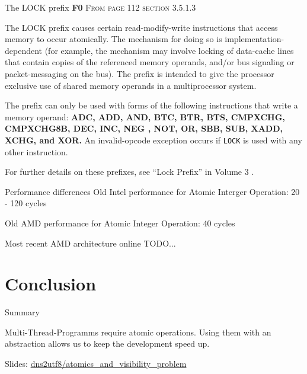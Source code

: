 \documentclass[10pt]{beamer}
\begin{document}
\begin{frame}{The LOCK prefix \textbf{F0}}
    \textsc{From page 112 section 3.5.1.3 \cite{AMD64ArchVol1}}

    The LOCK prefix causes certain
read-modify-write instructions that access memory to occur atomically.
The mechanism for doing so is \alert{implementation-dependent} (for example, the mechanism
may involve \alert{locking} of \alert{data-cache lines} that contain copies of
the referenced memory operands, and/or \alert{bus signaling} or packet-messaging on the bus).
The prefix is intended to give the processor exclusive use of shared memory
operands in a multiprocessor system.

The prefix can only be used with forms of the following instructions that write a memory operand:
\textbf{ADC, ADD, AND, BTC, BTR, BTS, CMPXCHG, CMPXCHG8B, DEC, INC, NEG
, NOT, OR, SBB, SUB, XADD, XCHG, and XOR.}
An invalid-opcode exception occurs if
\texttt{LOCK} is used with any other instruction.

For further details on these prefixes, see “Lock Prefix” in Volume 3 \cite{AMD64ArchVol3}.
\end{frame}

\begin{frame}{Performance differences}
    Old Intel performance for Atomic Interger Operation: 20 - 120 cycles

    Old AMD performance for Atomic Integer Operation: 40  cycles

    Most recent AMD architecture\cite{AMD64ArchVol1} online TODO...
\end{frame}

\section{Conclusion}

\begin{frame}{Summary}

  Multi-Thread-Programms require atomic operations.
  Using them with an abstraction allows us to keep the development speed up.

  \begin{center}Slides: \href{https://github.com/dns2utf8/atomics_and_visibility_problem}{dns2utf8/atomics\_and\_visibility\_problem}\end{center}


\end{frame}
\end{document}
